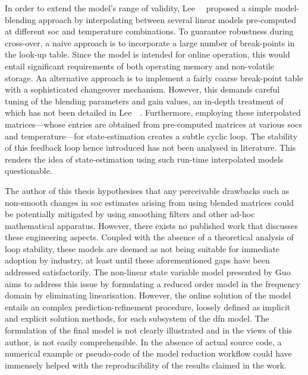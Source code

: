 In order  to extend  the model's  range of  validity, Lee~\etal{}~\cite{Lee2014}
proposed  a  simple model-blending  approach  by  interpolating between  several
linear models pre-computed at  different \gls{soc} and temperature combinations.
To guarantee robustness during cross-over, a  naive approach is to incorporate a
large  number  of  break-points  in  the  look-up  table.  Since  the  model  is
intended  for  online  operation,  this would  entail  significant  requirements
of  both operating  memory  and non-volatile  storage.  An alternative  approach
is  to  implement  a  fairly  coarse  break-point  table  with  a  sophisticated
changeover  mechanism. However,  this  demands careful  tuning  of the  blending
parameters  and  gain values,  an  in-depth  treatment  of  which has  not  been
detailed in Lee~\etal~\cite{Lee2014}.  Furthermore, employing these interpolated
matrices---whose  entries are  obtained  from pre-computed  matrices at  various
\glspl{soc} and temperature---for state-estimation creates a subtle cyclic loop.
The stability  of this feedback loop  hence introduced has not  been analysed in
literature.  This  renders the  idea  of  state-estimation using  such  run-time
interpolated models questionable.


The author  of this thesis hypothesises  that any perceivable drawbacks  such as
non-smooth changes  in \gls{soc} estimates  arising from using  blended matrices
could  be potentially  mitigated by  using  smoothing filters  and other  ad-hoc
mathematical apparatus. However,  there exists no published  work that discusses
these engineering aspects. Coupled with the absence of a theoretical analysis of
loop stability,  these models  are deemed  as not  being suitable  for immediate
adoption  by  industry, at  least  until  these  aforementioned gaps  have  been
addressed  satisfactorily.  The non-linear  state  variable  model presented  by
Guo~\etal{}~\cite{Guo2017} aims to  address this issue by  formulating a reduced
order model in  the frequency domain by eliminating  linearisation. However, the
online solution of the model entails an complex prediction-refinement procedure,
loosely defined as implicit and explicit solution methods, for each subsystem of
the  \gls{dfn}  model.  The  formulation  of the  final  model  is  not  clearly
illustrated and  in the views of  this author, is not  easily comprehensible. In
the absence  of actual source  code, a numerical  example or pseudo-code  of the
model reduction workflow could have immensely helped with the reproducibility of
the results claimed in the work.


